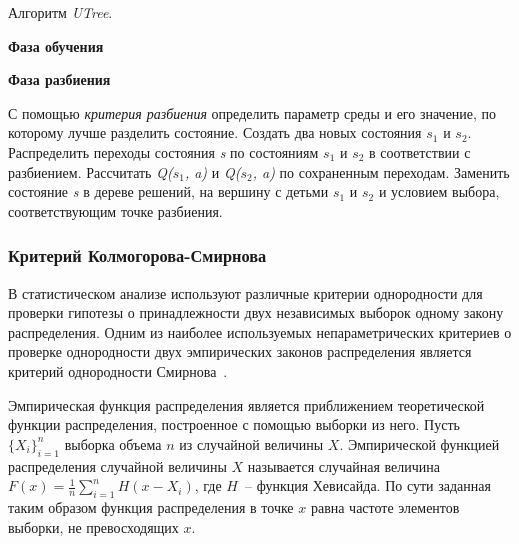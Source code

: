 \begin{algorithm}[h!]
    \caption{Алгоритм \textit{UTree}.}
    \label{utree_scheme}
    \textbf{Фаза обучения}
    \begin{algorithmic}[1]
    \end{algorithmic}
    \textbf{Фаза разбиения}
    \begin{algorithmic}[1]
            \ENDFOR
            \STATE С помощью \textit{критерия разбиения} определить параметр среды и его значение, по которому лучше разделить состояние.
                \STATE Создать два новых состояния $s_1$ и $s_2$.
                \STATE Распределить переходы состояния \textit{s} по состояниям $s_1$ и $s_2$ в соответствии с  разбиением.
                \STATE Рассчитать \textit{Q($s_1$, a)} и \textit{Q($s_2$, a)} по сохраненным переходам.
                \STATE Заменить состояние \textit{s} в дереве решений, на вершину с детьми $s_1$ и $s_2$ и условием выбора, соответствующим точке разбиения.
            \ENDIF
        \ENDFOR
    \end{algorithmic}
\end{algorithm}

\subsubsection{Критерий Колмогорова-Смирнова}
\label{ks_criteria}
В статистическом анализе используют различные критерии однородности для проверки гипотезы о принадлежности двух независимых выборок одному закону распределения. Одним из наиболее используемых непараметрических критериев о проверке однородности двух эмпирических законов распределения является критерий однородности Смирнова~\cite{stephens}.

Эмпирическая функция распределения является приближением теоретической функции распределения, построенное с помощью выборки из него. Пусть $\{X_i\}_{i = 1}^n$ выборка объема $n$ из случайной величины $X$. Эмпирической функцией распределения случайной величины $X$ называется случайная величина $F(x) = \frac{1}{n}\sum\limits_{i = 1}^n{H(x - X_i)}$, где $H$~-- функция Хевисайда. По сути заданная таким образом функция распределения в точке $x$ равна частоте элементов выборки, не превосходящих $x$.

